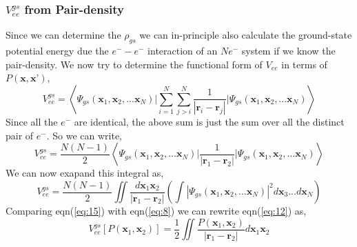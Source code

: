 \documentclass{article}
\begin{document}
\begin{Large}
\begin{flushleft}
 \subsubsection*{\Large{$V_{ee}^{gs}$ from Pair-density}}  
  Since we can determine the $\rho_{gs}$ we can in-principle also calculate the ground-state potential energy due the $e^--e^-$ interaction of an $Ne^-$ system if we know the pair-density. We now try to determine the functional form of $V_{ee}$ in terms of $P(\textbf{x},\textbf{x'})$,
  \begin{equation}\label{eq:15}
  V_{ee}^{gs} =\left\langle\Psi_{gs}(\textbf{x}_1,\textbf{x}_2,...\textbf{x}_N)\Bigg|\sum_{i=1}^N\sum_{j>i}^N\frac{1}{|\textbf{r}_i-\textbf{r}_j|}\Bigg|\Psi_{gs}(\textbf{x}_1,\textbf{x}_2,...\textbf{x}_N)\right\rangle
  \end{equation}
  Since all the $e^-$ are identical, the above sum is just the sum over all the distinct pair of $e^-$. So we can write,
  \begin{equation}\label{eq:16}
 V_{ee}^{gs} = \frac{N(N-1)}{2}\left\langle\Psi_{gs}(\textbf{x}_1,\textbf{x}_2,...\textbf{x}_N)\Bigg|\frac{1}{|\textbf{r}_1-\textbf{r}_2|}\Bigg|\Psi_{gs}(\textbf{x}_1,\textbf{x}_2,...\textbf{x}_N)\right\rangle
  \end{equation}
  We can now exapand this integral as,
  \begin{equation}\label{eq:17}
  V_{ee}^{gs} = \frac{N(N-1)}{2}\displaystyle{\iint}\frac{d\textbf{x}_1\textbf{x}_2}{|\textbf{r}_1-\textbf{r}_2|}\left(\displaystyle{\int}|\Psi_{gs}(\textbf{x}_1,\textbf{x}_2,...\textbf{x}_N)|^2d\textbf{x}_3...d\textbf{x}_N\right)
  \end{equation}
  Comparing eqn(\ref{eq:15}) with eqn(\ref{eq:8}) we can rewrite eqn(\ref{eq:12}) as,
  \begin{equation}\label{eq:18}
  V_{ee}^{gs}[P(\textbf{x}_1,\textbf{x}_2)] = \frac{1}{2}\displaystyle{\iint}\frac{P(\textbf{x}_1,\textbf{x}_2)}{|\textbf{r}_1-\textbf{r}_2|}d\textbf{x}_1\textbf{x}_2
  \end{equation}
  \end{flushleft}
 \end{Large}
 
\end{document}
